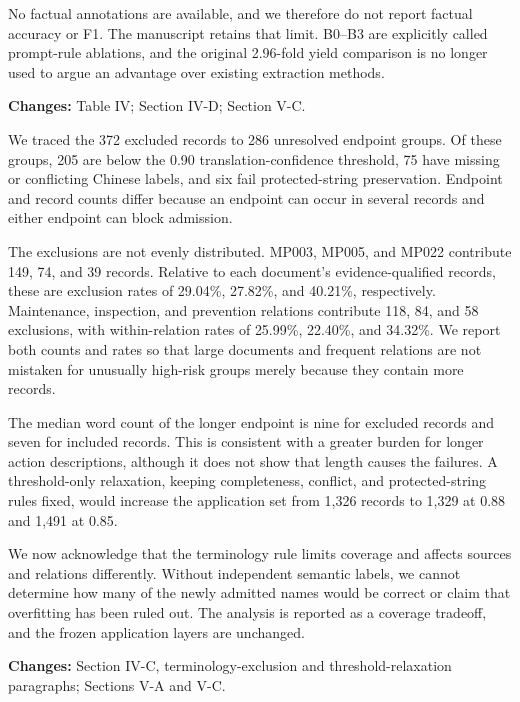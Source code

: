 No factual annotations are available, and we therefore do not report factual accuracy or F1. The manuscript retains that limit. B0--B3 are explicitly called prompt-rule ablations, and the original 2.96-fold yield comparison is no longer used to argue an advantage over existing extraction methods.

\textbf{Changes:} Table IV; Section IV-D; Section V-C.


We traced the 372 excluded records to 286 unresolved endpoint groups. Of these groups, 205 are below the 0.90 translation-confidence threshold, 75 have missing or conflicting Chinese labels, and six fail protected-string preservation. Endpoint and record counts differ because an endpoint can occur in several records and either endpoint can block admission.

The exclusions are not evenly distributed. MP003, MP005, and MP022 contribute 149, 74, and 39 records. Relative to each document's evidence-qualified records, these are exclusion rates of 29.04\%, 27.82\%, and 40.21\%, respectively. Maintenance, inspection, and prevention relations contribute 118, 84, and 58 exclusions, with within-relation rates of 25.99\%, 22.40\%, and 34.32\%. We report both counts and rates so that large documents and frequent relations are not mistaken for unusually high-risk groups merely because they contain more records.

The median word count of the longer endpoint is nine for excluded records and seven for included records. This is consistent with a greater burden for longer action descriptions, although it does not show that length causes the failures. A threshold-only relaxation, keeping completeness, conflict, and protected-string rules fixed, would increase the application set from 1,326 records to 1,329 at 0.88 and 1,491 at 0.85.

We now acknowledge that the terminology rule limits coverage and affects sources and relations differently. Without independent semantic labels, we cannot determine how many of the newly admitted names would be correct or claim that overfitting has been ruled out. The analysis is reported as a coverage tradeoff, and the frozen application layers are unchanged.

\textbf{Changes:} Section IV-C, terminology-exclusion and threshold-relaxation paragraphs; Sections V-A and V-C.

